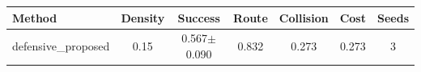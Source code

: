 \begin{tabular}{lcccccc}
\toprule
Method & Density & Success & Route & Collision & Cost & Seeds \\ 
\midrule
defensive_proposed & 0.15 & 0.567$\pm$0.090 & 0.832 & 0.273 & 0.273 & 3 \\ 
\bottomrule
\end{tabular}
